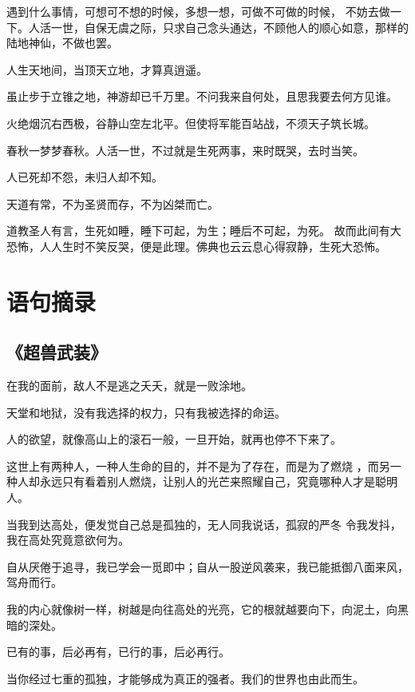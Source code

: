 \documentclass[UTF8,oneside]{ctexbook}
\begin{document}
\mfApache \quad 遇到什么事情，可想可不想的时候，多想一想，可做不可做的时候，
不妨去做一下。人活一世，自保无虞之际，只求自己念头通达，不顾他人的顺心如意，那样的
陆地神仙，不做也罢。

\mfApache \quad 人生天地间，当顶天立地，才算真逍遥。

\mfApache \quad 虽止步于立锥之地，神游却已千万里。不问我来自何处，且思我要去何方见谁。

\mfApache \quad 火绝烟沉右西极，谷静山空左北平。但使将军能百站战，不须天子筑长城。

\mfApache \quad 春秋一梦梦春秋。人活一世，不过就是生死两事，来时既哭，去时当笑。 

\mfApache \quad 人已死却不怨，未归人却不知。

\mfApache \quad 天道有常，不为圣贤而存，不为凶桀而亡。

\mfApache \quad 道教圣人有言，生死如睡，睡下可起，为生；睡后不可起，为死。
故而此间有大恐怖，人人生时不笑反哭，便是此理。佛典也云云息心得寂静，生死大恐怖。

\mfApache \quad 

\chapter{语句摘录}
\section{《超兽武装》}
\mfApache \quad 在我的面前，敌人不是逃之夭夭，就是一败涂地。

\mfApache \quad 天堂和地狱，没有我选择的权力，只有我被选择的命运。

\mfApache \quad 人的欲望，就像高山上的滚石一般，一旦开始，就再也停不下来了。

\mfApache \quad 这世上有两种人，一种人生命的目的，并不是为了存在，而是为了燃烧
，而另一种人却永远只有看着别人燃烧，让别人的光芒来照耀自己，究竟哪种人才是聪明人。

\mfApache \quad 当我到达高处，便发觉自己总是孤独的，无人同我说话，孤寂的严冬
令我发抖，我在高处究竟意欲何为。

\mfApache \quad 自从厌倦于追寻，我已学会一觅即中；自从一股逆风袭来，我已能抵御八面来风，驾舟而行。

\mfApache \quad 我的内心就像树一样，树越是向往高处的光亮，它的根就越要向下，向泥土，向黑暗的深处。

\mfApache \quad 已有的事，后必再有，已行的事，后必再行。

\mfApache \quad 当你经过七重的孤独，才能够成为真正的强者。我们的世界也由此而生。
\end{document}
